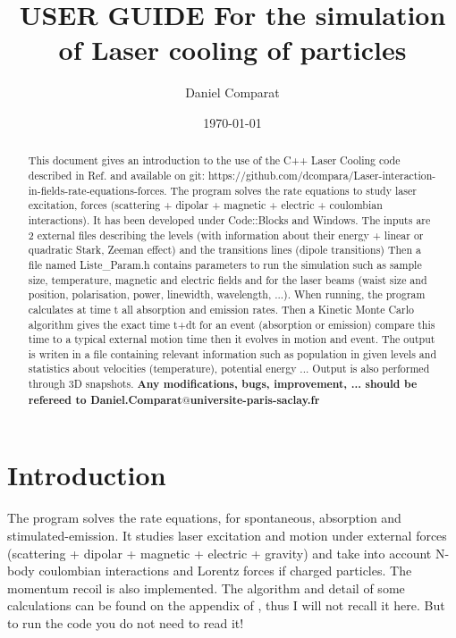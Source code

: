 \documentclass[amsmath,amssymb,nofootinbib]{revtex4-2}
\begin{document}
\title{USER GUIDE For the simulation of Laser cooling of particles}
\author{Daniel Comparat}

\date{\today}
             

\begin{abstract}
This document gives an introduction to the use of the C++ Laser Cooling code described in Ref. \cite{comparat2014molecular}
 and available on git: https://github.com/dcompara/Laser-interaction-in-fields-rate-equations-forces.
The program solves the rate equations to study laser excitation, forces (scattering + dipolar + magnetic + electric + coulombian interactions).
It has been developed under Code::Blocks and Windows.
The inputs are 2 external files describing the	levels (with information about their energy + linear or quadratic Stark, Zeeman effect) and the
	transitions		lines (dipole transitions)
Then a file named Liste\_Param.h contains parameters to run the simulation such as sample size, temperature, magnetic and electric fields and for the  	laser beams  (waist size and position, polarisation, power, linewidth, wavelength, ...).
When running, the program calculates at time t all absorption and emission rates. Then a Kinetic Monte Carlo algorithm gives the exact time t+dt for an event (absorption or emission) compare this time to a typical external motion  time then it evolves in motion and event.
The output is writen in a file containing relevant information such as population in given levels and statistics about velocities (temperature), potential energy ...
Output is also performed through 3D snapshots.
\textbf{Any modifications, bugs, improvement, ... should be refereed to
Daniel.Comparat$@$universite-paris-saclay.fr}
\end{abstract}


\maketitle





\section{Introduction}
The program solves the rate equations, for spontaneous, absorption and stimulated-emission.  It studies laser excitation and motion under external forces (scattering + dipolar + magnetic + electric + gravity) and take into account N-body coulombian interactions and Lorentz forces if charged particles. The momentum recoil is also implemented.
The algorithm and detail of some calculations can be found on the appendix of \cite{comparat2014molecular}, thus I will not recall it here.
 But to run the code you do not need to read it!
\end{document}
